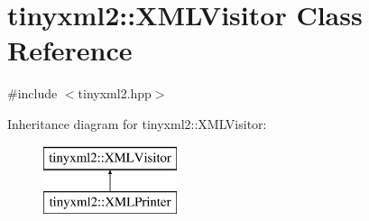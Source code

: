 \hypertarget{classtinyxml2_1_1_x_m_l_visitor}{\section{tinyxml2\-:\-:X\-M\-L\-Visitor Class Reference}
\label{classtinyxml2_1_1_x_m_l_visitor}
}


{\ttfamily \#include $<$tinyxml2.\-hpp$>$}

Inheritance diagram for tinyxml2\-:\-:X\-M\-L\-Visitor\-:\begin{figure}[H]
\begin{center}
\leavevmode
\includegraphics[height=2.000000cm]{classtinyxml2_1_1_x_m_l_visitor}
\end{center}
\end{figure}

